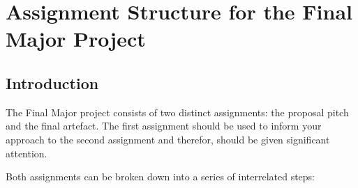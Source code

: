 \chapter{Assignment Structure for the Final Major Project}

\section*{Introduction}

The Final Major project consists of two distinct assignments: the proposal pitch and the final artefact. The first assignment should be used to inform your approach to the second assignment and therefor, should be given significant attention. 

Both assignments can be broken down into a series of interrelated steps: 

